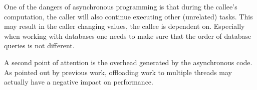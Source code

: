 One of the dangers of asynchronous programming is that during the callee's computation, the caller will also continue executing other (unrelated) tasks.
This may result in the caller changing values, the callee is dependent on.
Especially when working with databases one needs to make sure that the order of database queries is not different.

A second point of attention is the overhead generated by the asynchronous code.
As pointed out by previous work, offloading work to multiple threads may actually have a negative impact on performance.